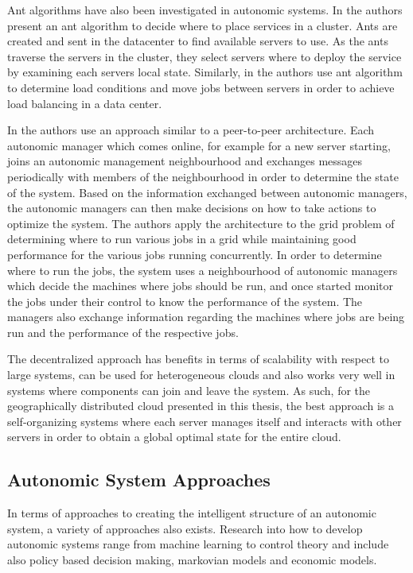 Ant algorithms have also been investigated in autonomic systems. In \cite{statmechcomplexnetwork} the authors present an ant algorithm to decide where to place services in a cluster. Ants are created and sent in the datacenter to find available servers to use. As the ants traverse the servers in the cluster, they select servers where to deploy the service by examining each servers local state. Similarly, in \cite{messor:loadbalaneants} the authors use ant algorithm to determine load conditions and move jobs between servers in order to achieve load balancing in a data center.

In \cite{decentralized1} the authors use an approach similar to a peer-to-peer architecture. Each autonomic manager which comes online, for example for a new server starting, joins an autonomic management neighbourhood and exchanges messages periodically with members of the neighbourhood in order to determine the state of the system. Based on the information exchanged between autonomic managers, the autonomic managers can then make decisions on how to take actions to optimize the system. The authors apply the architecture to the grid problem of determining where to run various jobs in a grid while maintaining good performance for the various jobs running concurrently. In order to determine where to run the jobs, the system uses a neighbourhood of autonomic managers which decide the machines where jobs should be run, and once started monitor the jobs under their control to know the performance of the system. The managers also exchange information regarding the machines where jobs are being run and the performance of the respective jobs.

The decentralized approach has benefits in terms of scalability with respect to large systems, can be used for heterogeneous clouds and also works very well in systems where components can join and leave the system. As such, for the geographically distributed cloud presented in this thesis, the best approach is a self-organizing systems where each server manages itself and interacts with other servers in order to obtain a global optimal state for the entire cloud.

\subsection{Autonomic System Approaches}

In terms of approaches to creating the intelligent structure of an autonomic system, a variety of approaches also exists. Research into how to develop autonomic systems range from machine learning to control theory and include also policy based decision making, markovian models and economic models.

